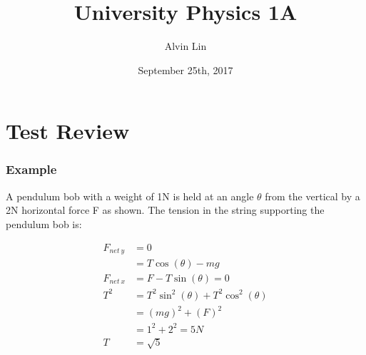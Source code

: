 \documentclass{math}
\title{University Physics 1A}
\author{Alvin Lin}
\date{September 25th, 2017}
\begin{document}
\maketitle

\section*{Test Review}

\subsubsection*{Example}
A pendulum bob with a weight of 1N is held at an angle \( \theta \) from the
vertical by a 2N horizontal force F as shown. The tension in the string
supporting the pendulum bob is:
\begin{center}
\end{center}
\begin{align*}
  F_{net\ y} &= 0 \\
  &= T\cos(\theta)-mg \\
  F_{net\ x} &= F-T\sin(\theta) = 0 \\
  T^2 &= T^2\sin^2(\theta)+T^2\cos^2(\theta) \\
  &= (mg)^2+(F)^2 \\
  &= 1^2+2^2 = 5N \\
  T &= \sqrt{5}
\end{align*}
\end{document}
